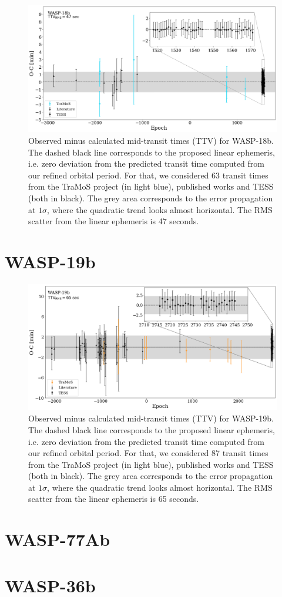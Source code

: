 \begin{figure}[H]
\includegraphics[width=1.0\textwidth]{imagenes/WASP18_TTV.png}
\caption{Observed minus calculated mid-transit times (TTV) for WASP-18b. The dashed black line corresponds to the proposed linear ephemeris, i.e. zero deviation from the predicted transit time  computed from our refined orbital period. For that, we considered 63 transit times from the TraMoS project (in light blue), published works and TESS (both in black). The grey area corresponds to the error propagation at $1\sigma$, where the quadratic trend looks almost horizontal.  The RMS scatter from the linear ephemeris is 47 seconds.}
\label{wasp18_ttv}
\end{figure}

\section{WASP-19b}

\begin{figure}[H]
\includegraphics[width=1.0\textwidth]{imagenes/WASP19_TTV.png}
\caption{Observed minus calculated mid-transit times (TTV) for WASP-19b. The dashed black line corresponds to the proposed linear ephemeris, i.e. zero deviation from the predicted transit time  computed from our refined orbital period. For that, we considered 87 transit times from the TraMoS project (in light blue), published works and TESS (both in black). The grey area corresponds to the error propagation at $1\sigma$, where the quadratic trend looks almost horizontal.  The RMS scatter from the linear ephemeris is 65 seconds.}
\label{wasp19_ttv}
\end{figure}

\section{WASP-77Ab}

\section{WASP-36b}